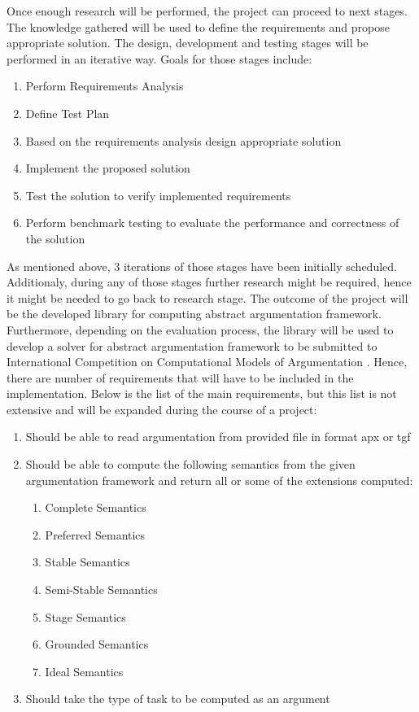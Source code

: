 Once enough research will be performed, the project can proceed to next stages. The knowledge gathered will be used to define the requirements and propose appropriate solution. The design, development and testing stages will be performed in an iterative way. Goals for those stages include:
\begin{enumerate}
	\item{Perform Requirements Analysis}
	\item{Define Test Plan}
	\item{Based on the requirements analysis design appropriate solution} 
	\item{Implement the proposed solution}
	\item{Test the solution to verify implemented requirements}
	\item{Perform benchmark testing to evaluate the performance and correctness of the solution}
\end{enumerate}
As mentioned above, 3 iterations of those stages have been initially scheduled. Additionaly, during any of those stages further research might be required, hence it might be needed to go back to research stage.
\newline
The outcome of the project will be the developed library for computing abstract argumentation framework. Furthermore, depending on the evaluation process, the library will be used to develop a solver for abstract argumentation framework to be submitted to International Competition on Computational Models of Argumentation \cite{ICCMA}. Hence, there are number of requirements that will have to be included in the implementation. Below is the list of the main requirements, but this list is not extensive and will be expanded during the course of a project:
\begin{enumerate}
	\item{Should be able to read argumentation from provided file in format apx or tgf}
	\item{Should be able to compute the following semantics from the given argumentation framework and return all or some of the extensions computed:}
		\begin{enumerate}
			\item{Complete Semantics}
			\item{Preferred Semantics}
			\item{Stable Semantics}
			\item{Semi-Stable Semantics}
			\item{Stage Semantics}
			\item{Grounded Semantics}
			\item{Ideal Semantics}
		\end{enumerate}
	\item{Should take the type of task to be computed as an argument}
\end{enumerate}
